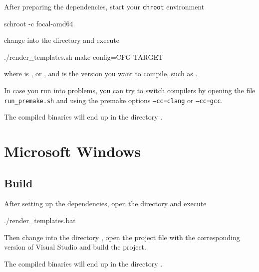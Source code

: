 After preparing the dependencies, start your \texttt{chroot}
environment

\begin{Verbatim64}
  schroot -c focal-amd64
\end{Verbatim64}

change into the directory  and execute

\begin{VerbatimBoth}
  ./render_templates.sh
  make config=CFG TARGET
\end{VerbatimBoth}

where  is , or
, and  is the version
you want to compile, such as .

In case you run into problems, you can try to switch compilers by
opening the file \texttt{run\_premake.sh} and using the premake
options \texttt{--cc=clang} or \texttt{--cc=gcc}.

The compiled binaries will end up in the directory .

\newpage %

\section{Microsoft Windows}

\subsection{Build}

After setting up the dependencies, open the directory 
and execute

\begin{VerbatimBoth}
  ./render_templates.bat
\end{VerbatimBoth}

Then change into the directory , open the
project file with the corresponding version of Visual Studio and build
the project.

The compiled binaries will end up in the directory .

